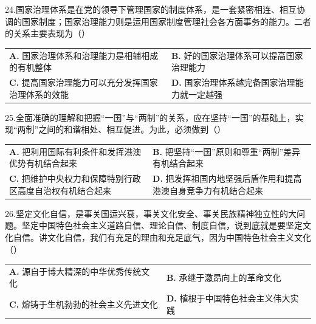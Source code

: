\documentclass[UTF8,11pt]{ctexart}
\begin{document}
24.国家治理体系是在党的领导下管理国家的制度体系，是一套紧密相连、相互协调的国家制度；国家治理能力则是运用国家制度管理社会各方面事务的能力。二者的关系主要表现为（）


\begin{center}\begin{tabular}{>{\raggedright\arraybackslash}p{\dimexpr(\linewidth-4\tabcolsep)/2\relax}>{\raggedright\arraybackslash}p{\dimexpr(\linewidth-4\tabcolsep)/2\relax}}
\textbf{A.} 国家治理体系和治理能力是相辅相成的有机整体 & \textbf{B.} 好的国家治理体系可以提高国家治理能力\\[.35em]
\textbf{C.} 提高国家治理能力可以充分发挥国家治理体系的效能 & \textbf{D.} 国家治理体系越完备国家治理能力就一定越强\\[.35em]\end{tabular}\end{center}

25.全面准确的理解和把握“一国”与“两制”的关系，应在坚持“一国”的基础上，实现“两制”之间的和谐相处、相互促进。为此，必须做到（）


\begin{center}\begin{tabular}{>{\raggedright\arraybackslash}p{\dimexpr(\linewidth-4\tabcolsep)/2\relax}>{\raggedright\arraybackslash}p{\dimexpr(\linewidth-4\tabcolsep)/2\relax}}
\textbf{A.} 把利用国际有利条件和发挥港澳优势有机结合起来 & \textbf{B.} 把坚持“一国”原则和尊重“两制”差异有机结合起来\\[.35em]
\textbf{C.} 把维护中央权力和保障特别行政区高度自治权有机结合起来 & \textbf{D.} 把发挥祖国内地坚强后盾作用和提高港澳自身竞争力有机结合起来\\[.35em]\end{tabular}\end{center}

26.坚定文化自信，是事关国运兴衰，事关文化安全、事关民族精神独立性的大问题。坚定中国特色社会主义道路自信、理论自信、制度自信，说到底就是要坚定文化自信。讲文化自信，我们有充足的理由和充足底气，因为中国特色社会主义文化（）


\begin{center}\begin{tabular}{>{\raggedright\arraybackslash}p{\dimexpr(\linewidth-4\tabcolsep)/2\relax}>{\raggedright\arraybackslash}p{\dimexpr(\linewidth-4\tabcolsep)/2\relax}}
\textbf{A.} 源自于博大精深的中华优秀传统文化 & \textbf{B.} 承继于激昂向上的革命文化\\[.35em]
\textbf{C.} 熔铸于生机勃勃的社会主义先进文化 & \textbf{D.} 植根于中国特色社会主义伟大实践\\[.35em]\end{tabular}\end{center}
\end{document}
